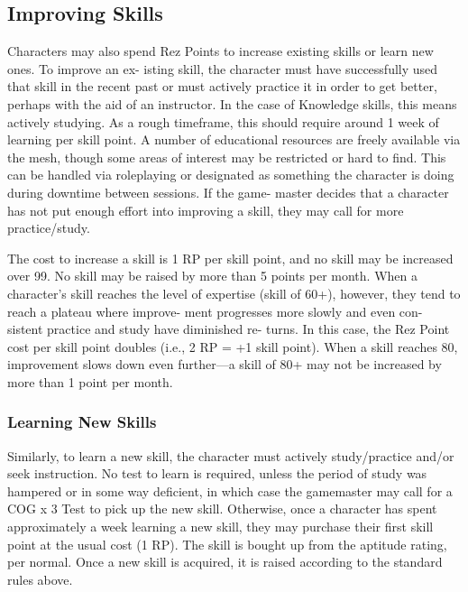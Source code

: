 \subsection{Improving Skills}

Characters may also spend Rez Points to increase 
existing skills or learn new ones. To improve an ex-
isting skill, the character must have successfully used 
that skill in the recent past or must actively practice 
it in order to get better, perhaps with the aid of an 
instructor. In the case of Knowledge skills, this means 
actively studying. As a rough timeframe, this should 
require around 1 week of learning per skill point. A 
number of educational resources are freely available 
via the mesh, though some areas of interest 
may be restricted or hard to find. This can 
be handled via roleplaying or designated 
as something the character is doing during 
downtime between sessions. If the game-
master decides that a character has not put 
enough effort into improving a skill, they 
may call for more practice/study. 

The cost to increase a skill is 1 RP per skill 
point, and no skill may be increased over 99. 
No skill may be raised by more than 5 points 
per month. When a character's skill reaches 
the level of expertise (skill of 60+), however, 
they tend to reach a plateau where improve-
ment progresses more slowly and even con-
sistent practice and study have diminished re-
turns. In this case, the Rez Point cost per skill 
point doubles (i.e., 2 RP = +1 skill point). 
When a skill reaches 80, improvement slows 
down even further—a skill of 80+ may not 
be increased by more than 1 point per month.

\subsubsection{Learning New Skills}

Similarly, to learn a new skill, the character 
must actively study/practice and/or seek 
instruction. No test to learn is required, 
unless the period of study was hampered 
or in some way deficient, in which case the 
gamemaster may call for a COG x 3 Test 
to pick up the new skill. Otherwise, once a 
character has spent approximately a week 
learning a new skill, they may purchase their 
first skill point at the usual cost (1 RP). The 
skill is bought up from the aptitude rating, 
per normal. Once a new skill is acquired, it is 
raised according to the standard rules above.

